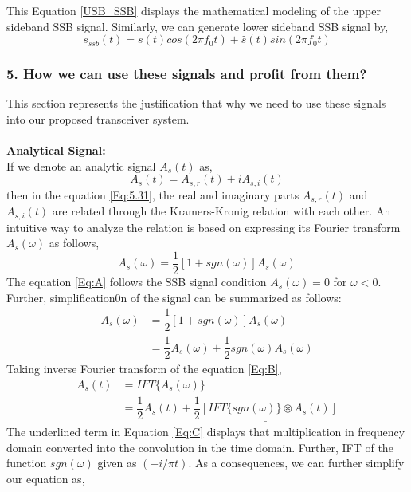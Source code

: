 This Equation \ref{USB_SSB} displays the mathematical modeling of the upper sideband SSB signal. Similarly, we can generate lower sideband SSB signal by,
\begin{equation}
{s}_{ssb}(t)=s(t)cos(2\pi f_0t)+\hat{s}(t)sin(2\pi f_0t)
\label{LSB_SSB}
\end{equation}

\subsubsection{5. How we can use these signals and profit from them?}
This section represents the justification that why we need to use these signals into our proposed transceiver system.\\ \\
\textbf{Analytical Signal:}\\
If we denote an analytic signal $A_s(t)$ as, 
\begin{equation}
A_s(t)=A_{s,r}(t)+iA_{s,i}(t)
\label{Eq:5.31}
\end{equation}
then in the equation \ref{Eq:5.31}, the real and imaginary parts $A_{s,r}(t)$ and $A_{s,i}(t)$ are related through the Kramers-Kronig relation with each other. An intuitive way to analyze the relation is based on expressing its Fourier transform $A_s(\omega)$ as follows,
\begin{equation}
A_s(\omega)=\dfrac{1}{2}[1+sgn(\omega)]A_s(\omega)
\label{Eq:A}
\end{equation}
The equation \ref{Eq:A} follows the SSB signal condition $A_s(\omega)=0$ for $\omega<0$. Further, simplification0n of the signal can be summarized as follows:
\begin{equation}
\begin{split}
A_s(\omega)&=\dfrac{1}{2}[1+sgn(\omega)]A_s(\omega)\\
&=\dfrac{1}{2}A_s(\omega)+\dfrac{1}{2}sgn(\omega)A_s(\omega)
\end{split}
\label{Eq:B}
\end{equation}
Taking inverse Fourier transform of the equation \ref{Eq:B},
\begin{equation}
\begin{split}
{A_s}(t)&=IFT\{A_s(\omega)\}\\
&=\dfrac{1}{2}{A_s}(t)+\underline{\dfrac{1}{2}[IFT\{sgn(\omega)\} \circledast {A_s}(t)]}
\end{split}
\label{Eq:C}
\end{equation}
The underlined term in Equation \ref{Eq:C} displays that multiplication in frequency domain converted into the convolution in the time domain. Further, IFT of the function $sgn(\omega)$ given as $(-i/\pi t)$. As a consequences, we can further simplify our equation as,
